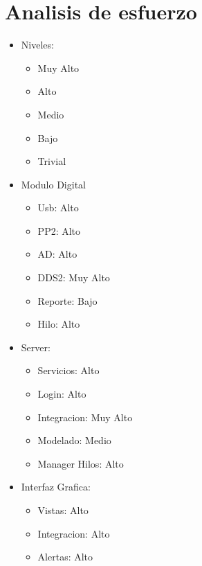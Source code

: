\section{Analisis de esfuerzo}

\begin{itemize}
\item Niveles:
    \begin{itemize}
    \item Muy Alto
    \item Alto
    \item Medio
    \item Bajo
    \item Trivial
    \end{itemize}

\item Modulo Digital
    \begin{itemize}
        \item Usb: Alto
        \item PP2: Alto
        \item AD: Alto
        \item DDS2: Muy Alto
        \item Reporte: Bajo
        \item Hilo: Alto
    \end{itemize}

\item Server:
    \begin{itemize}
    \item Servicios: Alto
    \item Login: Alto
    \item Integracion: Muy Alto
    \item Modelado: Medio
    \item Manager Hilos: Alto
    \end{itemize}
    
\item Interfaz Grafica:
    \begin{itemize}
        \item Vistas: Alto
        \item Integracion: Alto
        \item Alertas: Alto
    \end{itemize}
\end{itemize}
\newpage